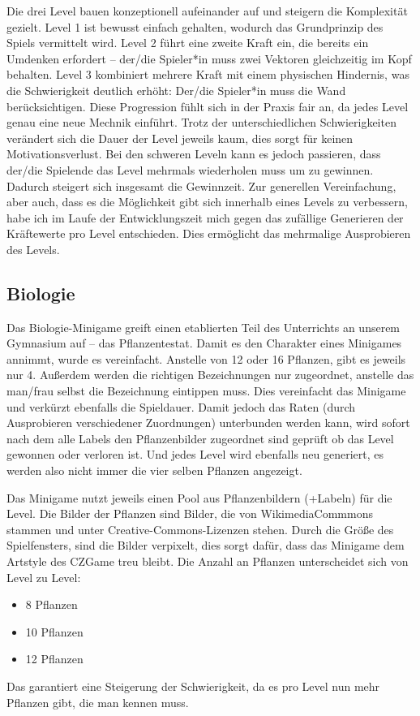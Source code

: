 Die drei Level bauen konzeptionell aufeinander auf und steigern die Komplexität gezielt. Level 1 ist bewusst einfach gehalten, wodurch das Grundprinzip des Spiels vermittelt wird. Level 2 führt eine zweite Kraft ein, die bereits ein Umdenken erfordert – der/die Spieler*in muss zwei Vektoren gleichzeitig im Kopf behalten. Level 3 kombiniert mehrere Kraft mit einem physischen Hindernis, was die Schwierigkeit deutlich erhöht:
Der/die Spieler*in muss die Wand berücksichtigen. Diese Progression fühlt sich in der Praxis fair an, da jedes Level genau eine neue Mechnik einführt. Trotz der unterschiedlichen Schwierigkeiten verändert sich die Dauer der Level jeweils kaum, dies sorgt für keinen Motivationsverlust.
Bei den schweren Leveln kann es jedoch passieren, dass der/die Spielende das Level mehrmals wiederholen muss um zu gewinnen. Dadurch steigert sich insgesamt die Gewinnzeit.
Zur generellen Vereinfachung, aber auch, dass es die Möglichkeit gibt sich innerhalb eines Levels zu verbessern, habe ich im Laufe der Entwicklungszeit mich gegen das zufällige Generieren der Kräftewerte pro Level entschieden. Dies ermöglicht das mehrmalige Ausprobieren des Levels.

\subsection{Biologie}
Das Biologie-Minigame greift einen etablierten Teil des Unterrichts an unserem Gymnasium auf – das Pflanzentestat.
Damit es den Charakter eines Minigames annimmt, wurde es vereinfacht. Anstelle von 12 oder 16 Pflanzen, gibt es jeweils nur 4. Außerdem werden die richtigen Bezeichnungen nur zugeordnet, anstelle das man/frau selbst die Bezeichnung eintippen muss. Dies vereinfacht das Minigame und verkürzt ebenfalls die Spieldauer.
Damit jedoch das Raten (durch Ausprobieren verschiedener Zuordnungen) unterbunden werden kann, wird sofort nach dem alle Labels den Pflanzenbilder zugeordnet sind geprüft ob das Level gewonnen oder verloren ist. Und jedes Level wird ebenfalls neu generiert, es werden also nicht immer die vier selben Pflanzen angezeigt.

Das Minigame nutzt jeweils einen Pool aus Pflanzenbildern (+Labeln) für die Level. Die Bilder der Pflanzen sind Bilder, die von WikimediaCommmons stammen und unter Creative-Commons-Lizenzen stehen.
Durch die Größe des Spielfensters, sind die Bilder verpixelt, dies sorgt dafür, dass das Minigame dem Artstyle des CZGame treu bleibt.
Die Anzahl an Pflanzen unterscheidet sich von Level zu Level:
\begin{itemize}
\item[\textbf{Level 1}] 8 Pflanzen
\item[\textbf{Level 2}] 10 Pflanzen
\item[\textbf{Level 3}] 12 Pflanzen
\end{itemize}
Das garantiert eine Steigerung der Schwierigkeit, da es pro Level nun mehr Pflanzen gibt, die man kennen muss.

